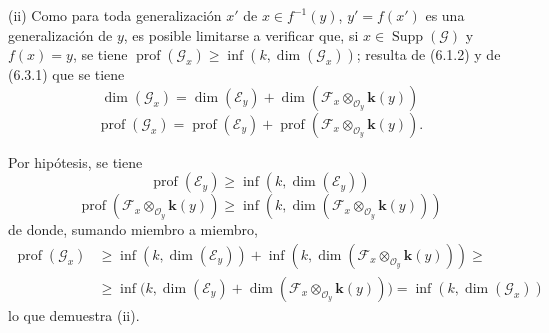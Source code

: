 
(ii) Como para toda generalización $x'$ de $x\in f^{-1}(y)$,
$y'=f(x')$ es una generalización de $y$, es posible limitarse a verificar que,
si $x\in\operatorname{Supp}(\mathscr G)$ y $f(x)=y$, se tiene
$\operatorname{prof}(\mathscr G_x)\geq\inf(k,\dim(\mathscr G_x))$; resulta de
(6.1.2) y de (6.3.1) que se tiene
\[
\dim(\mathscr G_x)=\dim(\mathscr E_y)+
\dim(\mathscr F_x\otimes_{\mathcal O_y}\boldsymbol{k}(y))
\]
\[
\operatorname{prof}(\mathscr G_x)=\operatorname{prof}(\mathscr E_y)+
\operatorname{prof}(\mathscr F_x\otimes_{\mathcal O_y}\boldsymbol{k}(y)).
\]

Por hipótesis, se tiene
\[
\operatorname{prof}(\mathscr E_y)\geq\inf(k,\dim(\mathscr E_y))
\]
\[
\operatorname{prof}(\mathscr F_x\otimes_{\mathcal O_y}\boldsymbol{k}(y))
\geq\inf(k,\dim(\mathscr F_x\otimes_{\mathcal O_y}\boldsymbol{k}(y)))
\]
de donde, sumando miembro a miembro,
\begin{align*}
\operatorname{prof}(\mathscr G_x)
&\geq\inf(k,\dim(\mathscr E_y))
+\inf(k,\dim(\mathscr F_x\otimes_{\mathcal O_y}\boldsymbol{k}(y)))\geq{}\\
&\geq\inf\bigl(k,\dim(\mathscr E_y)
+\dim(\mathscr F_x\otimes_{\mathcal O_y}\boldsymbol{k}(y))\bigr)
=\inf(k,\dim(\mathscr G_x))
\end{align*}
lo que demuestra (ii).
